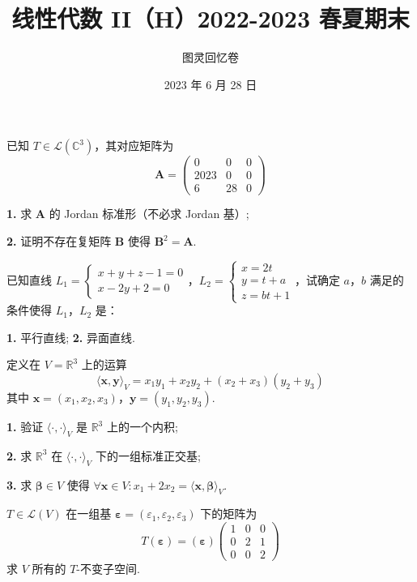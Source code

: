 \documentclass[UTF8,14pt,normal]{ctexart}
\title{\textbf{线性代数 II（H）2022-2023 春夏期末}}
\author{图灵回忆卷}
\date{2023 年 6 月 28 日}
\begin{document}
\maketitle

 已知 $ T \in \mathcal{L}(\mathbb{C}^3) $，其对应矩阵为
\[ \mathbf{A} = \begin{pmatrix} 0 & 0 & 0 \\ 2023 & 0 & 0 \\ 6 & 28 & 0 \end{pmatrix} \]

\textbf{1.} 求 $ \mathbf{A} $ 的 Jordan 标准形（不必求 Jordan 基）;

\textbf{2.} 证明不存在复矩阵 $ \mathbf{B} $ 使得 $ \mathbf{B}^2 = \mathbf{A} $.

 已知直线 $ L_1 = \begin{cases} x + y + z - 1 = 0 \\ x - 2y + 2 = 0 \end{cases} $，$ L_2 = \begin{cases} x = 2t \\ y = t + a \\ z = bt + 1 \end{cases} $，试确定 $ a $，$ b $ 满足的条件使得 $ L_1 $，$ L_2 $ 是：

\textbf{1.} 平行直线; \qquad \textbf{2.} 异面直线.

 定义在 $ V = \mathbb{R}^3 $ 上的运算
\[ \langle \boldsymbol{x}, \boldsymbol{y} \rangle_V = x_1 y_1 + x_2 y_2 + (x_2 + x_3)(y_2 + y_3) \]
其中 $ \boldsymbol{x} = (x_1, x_2, x_3) $，$ \boldsymbol{y} = (y_1, y_2, y_3) $.

\textbf{1.} 验证 $ \langle \cdot, \cdot \rangle_V $ 是 $ \mathbb{R}^3 $ 上的一个内积;

\textbf{2.} 求 $ \mathbb{R}^3 $ 在 $ \langle \cdot, \cdot \rangle_V $ 下的一组标准正交基;

\textbf{3.} 求 $ \boldsymbol{\beta} \in V $ 使得 $ \forall \boldsymbol{x} \in V: x_1 + 2x_2 = \langle \boldsymbol{x}, \boldsymbol{\beta} \rangle_V $.

 $ T \in \mathcal{L}(V) $ 在一组基 $ \boldsymbol{\varepsilon} = (\varepsilon_1, \varepsilon_2, \varepsilon_3) $ 下的矩阵为
\[ T(\boldsymbol{\varepsilon}) = (\boldsymbol{\varepsilon}) \begin{pmatrix} 1 & 0 & 0 \\ 0 & 2 & 1 \\ 0 & 0 & 2 \end{pmatrix} \]
求 $ V $ 所有的 $ T $-不变子空间.
\end{document}

